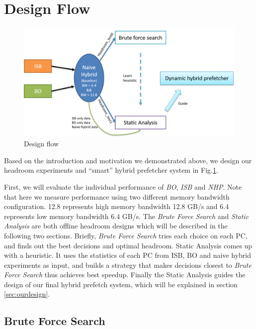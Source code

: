 \section{Design Flow}
\label{sec:designflow}

\begin{figure}[ht!]
	\centering
	\includegraphics[width=1.0\textwidth]{images/design_flow.png}
	\caption{Design flow}
	\label{fig:design_flow}
\end{figure}

Based on the introduction and motivation we demonstrated above, we design our headroom experiments and ``smart'' hybrid prefetcher system in Fig.\ref{fig:design_flow}.

First, we will evaluate the individual performance of \emph{BO}, \emph{ISB} and \emph{NHP}. Note that here we measure performance using two different memory bandwidth configuration. 12.8 represents high memory bandwidth 12.8 GB/s and 6.4 represents low memory bandwidth 6.4 GB/s. The \emph{Brute Force Search} and \emph{Static Analysis} are both offline headroom designs which will be described in the following two sections. Briefly, \emph{Brute Force Search} tries each choice on each PC, and finds out the best decisions and optimal headroom. Static Analysis comes up with a heuristic. It uses the statistics of each PC from ISB, BO and naive hybrid experiments as input, and builds a strategy that makes decisions closest to \emph{Brute Force Search} thus achieves best speedup. Finally the Static Analysis guides the design of our final hybrid prefetch system, which will be explained in section \ref{sec:ourdesign}.

  \subsection{Brute Force Search}
  \label{sec:bruteforcesearch}

